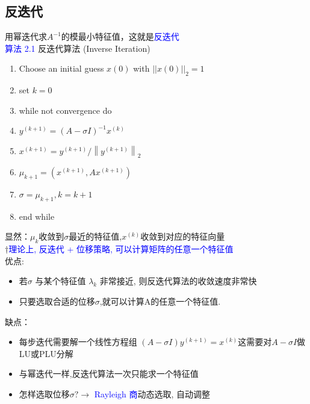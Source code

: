 \documentclass[12pt,a4paper]{article}
\begin{document}
	\subsection{反迭代}
	\noindent 用幂迭代求$A^{-1}$的模最小特征值，这就是\textcolor{blue}{反迭代}\\
	\textcolor{blue}{算法 2.1} 反迭代算法 (Inverse Iteration)\\
	\begin{enumerate}[1:]
		\item Choose an initial guess $x(0)$ with $||x(0)||_{2} = 1$
		\item set $k=0$
		\item while not convergence do
		\item \qquad$y^{(k+1)} = (A-\sigma I)^{-1}x^{(k)}$
		\item \qquad$x^{(k+1)}=y^{(k+1)} /\left\|y^{(k+1)}\right\|_{2}$
		\item \qquad$\mu_{k+1}=\left(x^{(k+1)}, A x^{(k+1)}\right)$
		\item \qquad$\sigma=\mu_{k+1},k=k+1$
		\item end while
	\end{enumerate}
	显然：$\mu_{k}$收敛到$\sigma$最近的特征值,$x^({k})$收敛到对应的特征向量\\
	$\dagger$\textcolor{blue}{理论上, 反迭代 + 位移策略, 可以计算矩阵的任意一个特征值}\\
	优点:
	\begin{itemize}
		\item 若$\sigma$ 与某个特征值 $\lambda_{k}$ 非常接近, 则反迭代算法的收敛速度非常快
		\item 只要选取合适的位移$\sigma$,就可以计算A的任意一个特征值.
	\end{itemize}
	缺点：
	\begin{itemize}
		\item 每步迭代需要解一个线性方程组 $(A-\sigma I) y^{(k+1)}=x^{(k)}$这需要对$A-\sigma I$做LU或PLU分解
		\item 与幂迭代一样,反迭代算法一次只能求一个特征值
		\item 怎样选取位移$\sigma ? \rightarrow$ \textcolor{blue}{Rayleigh 商}动态选取, 自动调整
	\end{itemize}
\end{document}
